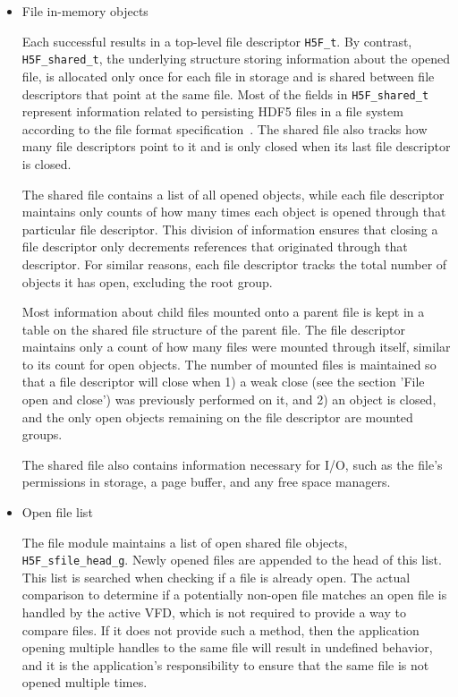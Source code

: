 \begin{itemize}
    \item File in-memory objects

Each successful  results in a top-level file descriptor \texttt{H5F\_t}. By contrast, \texttt{H5F\_shared\_t}, the underlying structure storing information about the opened file, is allocated only once for each file in storage and is shared between file descriptors that point at the same file. Most of the fields in \texttt{H5F\_shared\_t} represent information related to persisting HDF5 files in a file system according to the file format specification~\cite{ffmt}. The shared file also tracks how many file descriptors point to it and is only closed when its last file descriptor is closed.

The shared file contains a list of all opened objects, while each file descriptor maintains only counts of how many times each object is opened through that particular file descriptor. This division of information ensures that closing a file descriptor only decrements references that originated through that descriptor. For similar reasons, each file descriptor tracks the total number of objects it has open, excluding the root group.

Most information about child files mounted onto a parent file is kept in a table on the shared file structure of the parent file. The file descriptor maintains only a count of how many files were mounted through itself, similar to its count for open objects. The number of mounted files is maintained so that a file descriptor will close when 1) a weak close (see the section 'File open and close') was previously performed on it, and 2) an object is closed, and the only open objects remaining on the file descriptor are mounted groups.

The shared file also contains information necessary for I/O, such as the file's permissions in storage, a page buffer, and any free space managers.

 \item Open file list

The file module maintains a list of open shared file objects, \texttt{H5F\_sfile\_head\_g}. Newly opened files are appended to the head of this list. This list is searched when checking if a file is already open. The actual comparison to determine if a potentially non-open file matches an open file is handled by the active VFD, which is not required to provide a way to compare files. If it does not provide such a method, then the application opening multiple handles to the same file will result in undefined behavior, and it is the application's responsibility to ensure that the same file is not opened multiple times.


\end{itemize}
